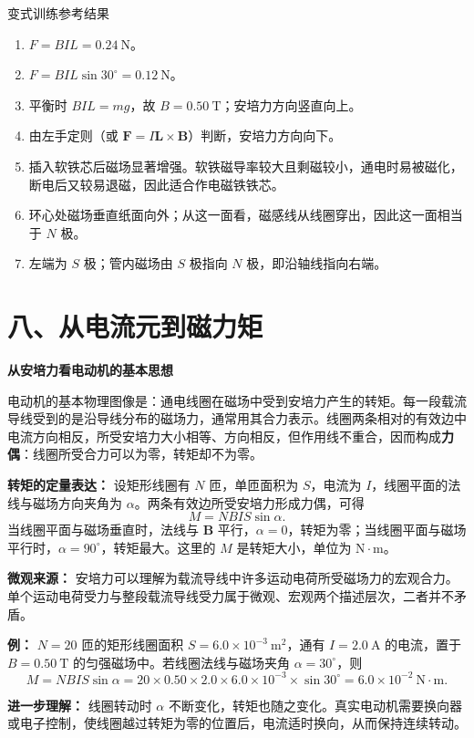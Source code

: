 \begin{learningbox}{变式训练参考结果}
\begin{enumerate}[itemsep=0.45em,topsep=0.3em,parsep=0pt]
  \item $F=BIL=0.24\ \mathrm N$。
  \item $F=BIL\sin30^\circ=0.12\ \mathrm N$。
  \item 平衡时 $BIL=mg$，故 $B=0.50\ \mathrm T$；安培力方向竖直向上。
  \item 由左手定则（或 $\boldsymbol F=I\boldsymbol L\times\boldsymbol B$）判断，安培力方向向下。
  \item 插入软铁芯后磁场显著增强。软铁磁导率较大且剩磁较小，通电时易被磁化，断电后又较易退磁，因此适合作电磁铁铁芯。
  \item 环心处磁场垂直纸面向外；从这一面看，磁感线从线圈穿出，因此这一面相当于 $N$ 极。
  \item 左端为 $S$ 极；管内磁场由 $S$ 极指向 $N$ 极，即沿轴线指向右端。
\end{enumerate}
\end{learningbox}

\section*{八、从电流元到磁力矩}

\begin{competitionbox}
\textbf{从安培力看电动机的基本思想}

电动机的基本物理图像是：通电线圈在磁场中受到安培力产生的转矩。每一段载流导线受到的是沿导线分布的磁场力，通常用其合力表示。线圈两条相对的有效边中电流方向相反，所受安培力大小相等、方向相反，但作用线不重合，因而构成\textbf{力偶}：线圈所受合力可以为零，转矩却不为零。

\begin{center}


\label{fig:motor-coil-torque}
\end{center}

\textbf{转矩的定量表达：} 设矩形线圈有 $N$ 匝，单匝面积为 $S$，电流为 $I$，线圈平面的法线与磁场方向夹角为 $\alpha$。两条有效边所受安培力形成力偶，可得
\[
\boxed{M=NBIS\sin\alpha}.
\]
当线圈平面与磁场垂直时，法线与 $\boldsymbol B$ 平行，$\alpha=0$，转矩为零；当线圈平面与磁场平行时，$\alpha=90^\circ$，转矩最大。这里的 $M$ 是转矩大小，单位为 $\mathrm{N\cdot m}$。

\textbf{微观来源：} 安培力可以理解为载流导线中许多运动电荷所受磁场力的宏观合力。单个运动电荷受力与整段载流导线受力属于微观、宏观两个描述层次，二者并不矛盾。

\textbf{例：} $N=20$ 匝的矩形线圈面积 $S=6.0\times10^{-3}\ \mathrm{m^2}$，通有 $I=2.0\ \mathrm A$ 的电流，置于 $B=0.50\ \mathrm T$ 的匀强磁场中。若线圈法线与磁场夹角 $\alpha=30^\circ$，则
\[
M=NBIS\sin\alpha
=20\times0.50\times2.0\times6.0\times10^{-3}\times\sin30^\circ
=6.0\times10^{-2}\ \mathrm{N\cdot m}.
\]

\textbf{进一步理解：} 线圈转动时 $\alpha$ 不断变化，转矩也随之变化。真实电动机需要换向器或电子控制，使线圈越过转矩为零的位置后，电流适时换向，从而保持连续转动。
\end{competitionbox}

